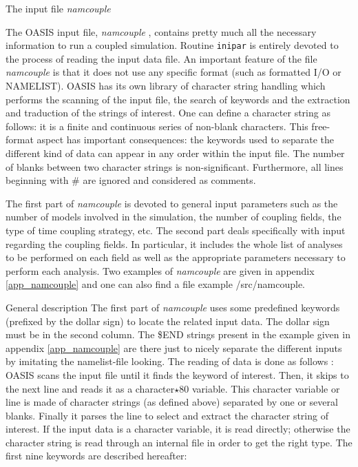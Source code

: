 \begin{subsection}{The input file {\it namcouple}}
\label{subsec_input}

The OASIS input file, {\em namcouple }, contains pretty much all
the necessary information to run a coupled simulation. Routine {\tt inipar}
is entirely devoted to the process of reading the input data file.
An important feature of the file {\em namcouple } is that it does not
use any specific format (such as formatted I/O or NAMELIST). OASIS has its
own library of character string handling which performs the
scanning of the input file, the search of keywords and the extraction
and traduction of the strings of interest. One can define a character string
as follows: it is a finite and continuous series of non-blank characters.
This free-format aspect has important consequences: the keywords used to
separate the different kind of data can appear in any order within the
input file. The number of blanks between two character strings is
non-significant. Furthermore, all lines beginning with \# are ignored and
considered as comments.

\vspace{0.4cm}

The first part
of {\em namcouple } is devoted to general input parameters such as the number
of models involved in the simulation, the number of coupling fields,
the type of time coupling strategy, etc. 
The second part deals
specifically with input regarding the coupling fields. In particular,
it includes
the whole list of analyses to be performed on each field as well as
the appropriate parameters necessary to perform each analysis.
Two examples of {\em namcouple} are given in appendix
\ref{app_namcouple} and one can also find a file example /src/namcouple.

\begin{subsubsection}{General description}
\label{subsubsec_general}
The first
part of {\em namcouple } uses some predefined keywords (prefixed by the dollar
sign) to locate the related
input data. The dollar sign must be in the second column. The \$END strings
present in the example given in appendix \ref{app_namcouple} are there just
to nicely separate
the different inputs by imitating the namelist-file looking. 
The reading of data is done as follows :
OASIS scans the input file until it finds the keyword of interest. Then,
it skips to the next line and reads it as a character$\star$80 variable.
This character variable or line is made of character strings (as defined above)
separated by one or several blanks. Finally it parses the line to select and
extract the character string of interest. If the input data is a character
variable, it is read directly; otherwise the
character string is read through an internal file in order to get the right
type. The first nine keywords are described hereafter:


\end{subsubsection}
\end{subsection}
